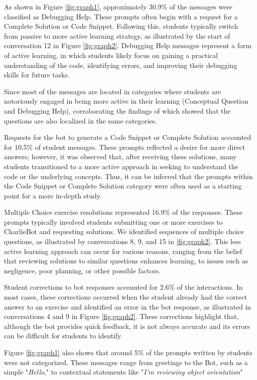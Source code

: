 \documentclass[a4paper,twoside]{article}
\begin{document}
As shown in Figure \ref{fig:graph1}, approximately 30.9\% of the messages were
classified as Debugging Help. These prompts often begin with a request for a
Complete Solution or Code Snippet. Following this, students typically switch from
passive to more active learning strategy, as illustrated by the start
of conversation 12 in Figure \ref{fig:graph2}. Debugging Help messages represent
a form of active learning, in which students likely focus on gaining a practical
understanding of the code, identifying errors, and improving their debugging
skills for future tasks.

Since most of the messages are located in categories where students are
notoriously engaged in being more active in their learning (Conceptual Question
and Debugging Help), corroborating the findings of \cite{Ghimire24} which
showed that the questions are also localized in the same categories.

Requests for the bot to generate a Code Snippet or Complete Solution accounted
for 10.5\% of student messages. These prompts reflected a desire for more
direct answers; however, it was observed that, after receiving these solutions,
many students transitioned to a more active approach in seeking to understand
the code or the underlying concepts. Thus, it can be inferred that the prompts
within the Code Snippet or Complete Solution category were often used as a
starting point for a more in-depth study.

Multiple Choice exercise resolutions represented 16.9\% of the responses.
These prompts typically involved students submitting one or more exercises to
CharlieBot and requesting solutions. We identified sequences of multiple choice
questions, as illustrated by conversations 8, 9, and 15 in \ref{fig:graph2}.
This less active learning approach can occur for various reasons, ranging from
the belief that reviewing solutions to similar questions enhances learning, to
issues such as negligence, poor planning, or other possible factors.

Student corrections to bot responses accounted for 2.6\% of the
interactions. In most cases, these corrections occurred when the student already
had the correct answer to an exercise and identified an error in the bot
response, as illustrated in conversations 4 and 9 in Figure \ref{fig:graph2}.
These corrections highlight that, although the bot provides quick feedback, it
is not always accurate and its errors can be difficult for students to
identify.

Figure \ref{fig:graph1} also shows that around 5\% of the prompts written by
students were not categorized. These messages range from greetings to the Bot,
such as a simple "\textit{Hello}," to contextual statements like
"\textit{I'm reviewing object orientation}"
\end{document}
